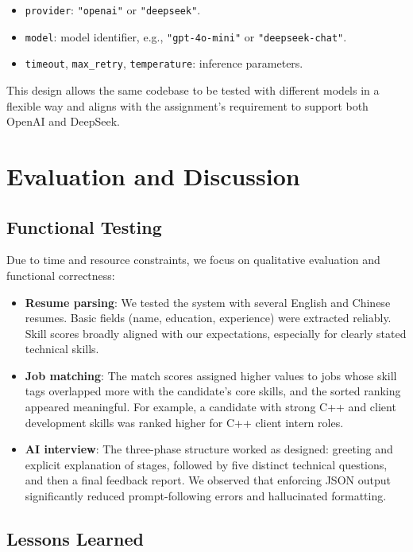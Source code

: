 \documentclass[11pt,a4paper]{article}
\begin{document}
\begin{itemize}
    \item \texttt{provider}: \texttt{"openai"} or \texttt{"deepseek"}.
    \item \texttt{model}: model identifier, e.g., \texttt{"gpt-4o-mini"} or \texttt{"deepseek-chat"}.
    \item \texttt{timeout}, \texttt{max\_retry}, \texttt{temperature}: inference parameters.
\end{itemize}

This design allows the same codebase to be tested with different models in a flexible way and aligns with the assignment's requirement to support both OpenAI and DeepSeek.

\section{Evaluation and Discussion}

\subsection{Functional Testing}

Due to time and resource constraints, we focus on qualitative evaluation and functional correctness:

\begin{itemize}
    \item \textbf{Resume parsing}: We tested the system with several English and Chinese resumes. Basic fields (name, education, experience) were extracted reliably. Skill scores broadly aligned with our expectations, especially for clearly stated technical skills.
    \item \textbf{Job matching}: The match scores assigned higher values to jobs whose skill tags overlapped more with the candidate's core skills, and the sorted ranking appeared meaningful. For example, a candidate with strong C++ and client development skills was ranked higher for C++ client intern roles.
    \item \textbf{AI interview}: The three-phase structure worked as designed: greeting and explicit explanation of stages, followed by five distinct technical questions, and then a final feedback report. We observed that enforcing JSON output significantly reduced prompt-following errors and hallucinated formatting.
\end{itemize}

\subsection{Lessons Learned}
\end{document}
